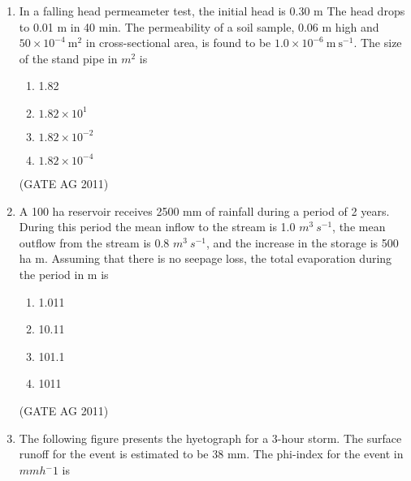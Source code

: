 \documentclass[journal,12pt,onecolumn]{IEEEtran}
\theoremstyle{remark}
\begin{document}
\begin{enumerate}
\item In a falling head permeameter test, the initial head is 0.30 m
The head drops to 0.01 m in 40 min.  
The permeability of a soil sample, 0.06 m high and $50\times 10^{-4}\ \mathrm{m^2}$ in cross-sectional area, is found to be $1.0\times 10^{-6}\ \mathrm{m\ s^{-1}}$.  
The size of the stand pipe in ${m^2}$ is
\begin{multicols}{4}
\begin{enumerate}
\item 1.82
\item $1.82\times 10^{1}$
\item $1.82\times 10^{-2}$
\item $1.82\times 10^{-4}$
\end{enumerate}
\end{multicols}
\hfill{(GATE AG 2011)}

\item A 100 ha reservoir receives 2500 mm of rainfall during a period of 2 years.  
During this period the mean inflow to the stream is 1.0 ${m^3\ s^{-1}}$, the mean outflow from the stream is 0.8 ${m^3\ s^{-1}}$, and the increase in the storage is 500 ha m.  
Assuming that there is no seepage loss, the total evaporation during the period in m is
\begin{multicols}{4}
\begin{enumerate}
\item 1.011
\item 10.11
\item 101.1
\item 1011
\end{enumerate}
\end{multicols}
\hfill{(GATE AG 2011)}

\item The following figure presents the hyetograph for a 3-hour storm. The surface runoff for the event is estimated to be 38 mm. The phi-index for the event in $mm h{^-1}$ is 



\begin{figure}[h!]
\centering
{}
\end{figure}
\end{enumerate}
\end{document}
